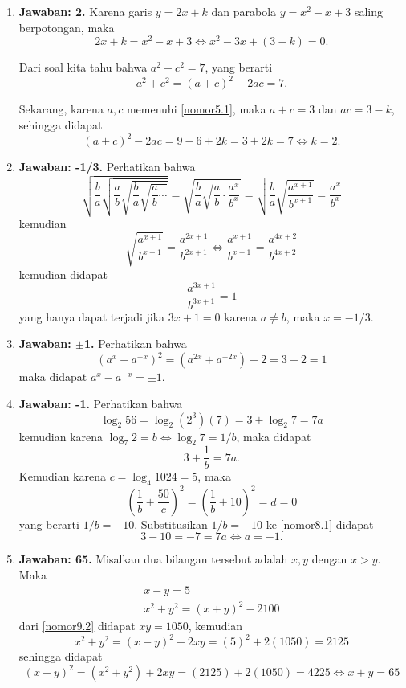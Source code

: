 \begin{enumerate}
\item \textbf{Jawaban: 2.} Karena garis $y=2x+k$ dan parabola $y=x^2-x+3$ saling berpotongan, maka \begin{equation}\label{nomor5.1}2x+k = x^2-x+3 \Leftrightarrow x^2-3x+(3-k) = 0.\end{equation} \par Dari soal kita tahu bahwa $a^2 + c^2 = 7$, yang berarti \[a^2 + c^2 = (a+c)^2 - 2ac = 7.\]\par Sekarang, karena $a,c$ memenuhi \eqref{nomor5.1}, maka $a+c = 3$ dan $ac = 3-k$, sehingga didapat \[(a+c)^2-2ac = 9-6+2k = 3+2k = 7\Leftrightarrow k = 2.\]

\item \textbf{Jawaban: -1/3.} Perhatikan bahwa \[\sqrt{\frac{b}{a}\sqrt{\frac{a}{b}\sqrt{\frac{b}{a}\sqrt{\frac{a}{b}\cdots}}}} = \sqrt{\frac{b}{a}\sqrt{\frac{a}{b}\cdot \frac{a^x}{b^x}}} = \sqrt{\frac{b}{a}\sqrt{\frac{a^{x+1}}{b^{x+1}}}} = \frac{a^x}{b^x}\]kemudian\[\sqrt{\frac{a^{x+1}}{b^{x+1}}} = \frac{a^{2x+1}}{b^{2x+1}}\Leftrightarrow \frac{a^{x+1}}{b^{x+1}} = \frac{a^{4x+2}}{b^{4x+2}}\]kemudian didapat \[\frac{a^{3x+1}}{b^{3x+1}} = 1\]yang hanya dapat terjadi jika $3x+1 = 0$ karena $a\neq b$, maka $x=-1/3$.

\item \textbf{Jawaban: ${\mathbf \pm}$1.} Perhatikan bahwa \[(a^x - a^{-x})^2 = (a^{2x} + a^{-2x}) - 2 = 3-2 = 1\]maka didapat $a^x - a^{-x} = \pm1.$

\item \textbf{Jawaban: -1.} Perhatikan bahwa \[\log_2 56 = \log_2 (2^3)(7) = 3+\log_2 7 = 7a\]kemudian karena $\log_7 2 = b\Leftrightarrow \log_2 7 = 1/b$, maka didapat \begin{equation}\label{nomor8.1}3+\frac{1}{b} = 7a.\end{equation}Kemudian karena $c = \log_4 1024 = 5$, maka \[\left(\frac{1}{b} + \frac{50}{c}\right)^2 = \left(\frac{1}{b} + 10\right)^2 = d = 0\]yang berarti $1/b = -10.$ Substitusikan $1/b = -10$ ke \eqref{nomor8.1} didapat \[3 - 10 = -7 = 7a\Leftrightarrow a = -1.\]

\item \textbf{Jawaban: 65.} Misalkan dua bilangan tersebut adalah $x,y$ dengan $x>y$. Maka
	\begin{gather}
	x-y = 5\label{nomor9.1}\\
	x^2+y^2 = (x+y)^2 - 2100\label{nomor9.2}
	\end{gather}
dari \eqref{nomor9.2} didapat $xy = 1050$, kemudian \[x^2+y^2 = (x-y)^2+2xy = (5)^2 + 2(1050) = 2125\]sehingga didapat \[(x+y)^2 = (x^2+y^2) + 2xy = (2125)+2(1050) = 4225\Leftrightarrow  x+y = 65\]


\end{enumerate}
